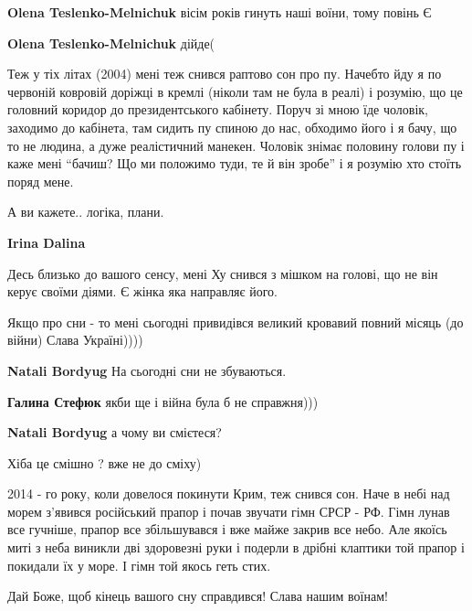 \begin{itemize}
\begin{itemize} %
\textbf{Olena Teslenko-Melnichuk} вісім років гинуть наші воїни, тому повінь Є

\textbf{Olena Teslenko-Melnichuk} дійде(
\end{itemize} %


Теж у тіх літах (2004) мені теж снився раптово сон про пу. Начебто йду я по
червоній ковровій доріжці в кремлі (ніколи там не була в реалі) і розумію, що
це головний коридор до президентського кабінету. Поруч зі мною їде чоловік,
заходимо до кабінета, там сидить пу спиною до нас, обходимо його і я бачу, що
то не людина, а дуже реалістичний манекен. Чоловік знімає половину голови пу і
каже мені \enquote{бачиш? Що ми положимо туди, те й він зробе} і я розумію хто стоїть
поряд мене.

А ви кажете.. логіка, плани.

\textbf{Irina Dalina} 

Десь близько до вашого сенсу, мені Ху снився з мішком на голові, що не він
керує своїми діями. Є жінка яка направляє його.


Якщо про сни - то мені сьогодні привидівся великий кровавий повний місяць (до війни)
Слава Україні))))

\begin{itemize} %
\textbf{Natali Bordyug} На сьогодні сни не збуваються.

\textbf{Галина Стефюк} якби ще і війна була б не справжня)))

\textbf{Natali Bordyug} а чому ви смієтеся?

Хіба це смішно ? вже не до сміху)
\end{itemize} %


2014 - го року, коли довелося покинути Крим, теж снився сон. Наче в небі над
морем з'явився російський прапор і почав звучати гімн СРСР - РФ. Гімн лунав все
гучніше, прапор все збільшувався і вже майже закрив все небо. Але якоїсь миті з
неба виникли дві здоровезні руки і подерли в дрібні клаптики той прапор і
покидали їх у море. І гімн той якось геть стих.

Дай Боже, щоб кінець вашого сну справдився! Слава нашим воїнам!


\end{itemize}
